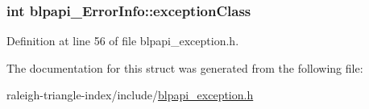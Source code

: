 \subsubsection[{\texorpdfstring{exception\+Class}{exceptionClass}}]{\setlength{\rightskip}{0pt plus 5cm}int blpapi\+\_\+\+Error\+Info\+::exception\+Class}\hypertarget{structblpapi___error_info_ab44f4d27997b5e2060b1d602bd0fb361}{}\label{structblpapi___error_info_ab44f4d27997b5e2060b1d602bd0fb361}


Definition at line 56 of file blpapi\+\_\+exception.\+h.



The documentation for this struct was generated from the following file\+:\begin{DoxyCompactItemize}
\item 
raleigh-\/triangle-\/index/include/\hyperlink{blpapi__exception_8h}{blpapi\+\_\+exception.\+h}\end{DoxyCompactItemize}
